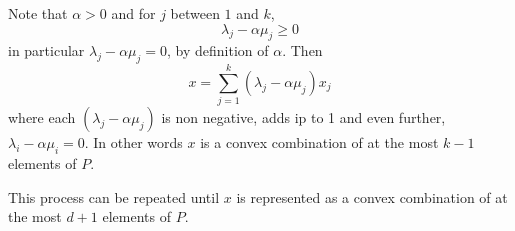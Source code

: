 \documentclass[answers]{exam}
\theoremstyle{definition}
\begin{document}
\begin{questions}
\begin{solution}
Note that $\alpha>0$ and for $j$ between $1$ and $k$, $$\lambda_j-\alpha\mu_j\geq 0$$ in particular $\lambda_j-\alpha\mu_j=0$, by definition of $\alpha$. Then $$x=\sum_{j=1}^{k}(\lambda_j-\alpha\mu_j)x_j$$ where each $(\lambda_j-\alpha\mu_j)$ is non negative, adds ip to 1 and even further, $\lambda_i-\alpha\mu_i=0$. In other words $x$ is a convex combination of at the most $k-1$ elements of $P$.

This process can be repeated until $x$ is represented as a convex combination of at the most $d+1$ elements of $P$.

\end{solution}

\end{questions}
\end{document}

